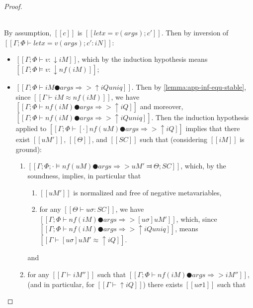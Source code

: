 \begin{proof}
\begin{caseof}
        \item {}\\
            By assumption, $[[c]]$ is $[[let x = v(args); c']]$. 
            Then by inversion of
            $[[Γ ; Φ ⊢ let x = v(args); c' : iN]]$: 
            \begin{itemize}
                \item $[[Γ ; Φ ⊢ v : ↓iM]]$, 
                    which by the induction hypothesis means 
                    $[[Γ; Φ ⊨ v : ↓nf(iM)]]$;
                \item $[[Γ ; Φ ⊢ iM ● args ⇒> ↑iQ uniq]]$. 
                    Then by \cref{lemma:app-inf-equ-stable}, since 
                    $[[Γ ⊢ iM ≈ nf(iM)]]$, we have
                    $[[Γ ; Φ ⊢ nf(iM) ● args ⇒> ↑iQ]]$
                    and moreover, $[[Γ ; Φ ⊢ nf(iM) ● args ⇒> ↑iQ uniq]]$.
                    Then the induction hypothesis applied to 
                    $[[Γ ; Φ ⊢ [·]nf(uM) ● args ⇒> ↑iQ]]$
                    implies that there exist $[[uM']]$, $[[Θ]]$, and $[[SC]]$ such that
                    (considering $[[iM]]$ is ground):
                    \begin{enumerate}
                        \item $[[ Γ; Φ; · ⊨ nf(uM) ● args ⇒> uM' ⫤ Θ; SC ]]$, 
                            which, by the soundness, implies, in particular
                            that 
                            \begin{enumerate}
                                \item $[[uM']]$ is normalized and 
                                    free of negative metavariables, 
                                \item \label{point:typing-completeness:AppLet:ih-sound} 
                                    for any $[[Θ ⊢ uσ : SC]]$, 
                                    we have $[[ Γ ; Φ ⊢ nf(iM) ● args ⇒> [uσ]uM' ]]$,
                                    which, since $[[Γ ; Φ ⊢ nf(iM) ● args ⇒> ↑iQ uniq]]$,
                                    means $[[Γ ⊢ [uσ]uM' ≈ ↑iQ]]$.
                            \end{enumerate}
                            and
                        \item for any $[[Γ ⊢ iM'']]$
                            such that $[[Γ; Φ ⊢ nf(iM) ● args ⇒> iM'']]$,
                            (and in particular, for $[[Γ ⊢ ↑iQ]]$)
                            there exists $[[uσ1]]$ such that 
                            \begin{enumerate}

\end{enumerate}
\end{enumerate}
\end{itemize}
\end{caseof}
\end{proof}

